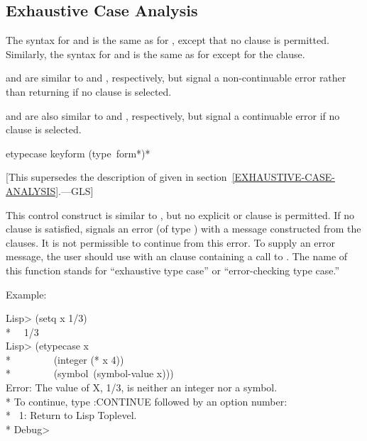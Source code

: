 \subsection{Exhaustive Case Analysis}
\label{EXHAUSTIVE-CASE-ANALYSIS-CONDITIONS}

The syntax for  and  is the same as for , except
that no  clause is permitted. Similarly, the syntax for  and
 is the same as for  except for the  clause.

 and  are similar to  and , respectively, but signal
a non-continuable error rather than returning  if no clause is selected.

 and  are also similar to  and , respectively,
but signal a
continuable error if no clause is selected.

\begin{defmac}
etypecase keyform {(type {\,form}*)}*

   [This supersedes the description of 
   given in section~\ref{EXHAUSTIVE-CASE-ANALYSIS}.---GLS]

  This control construct is similar to , but no explicit 
  or  clause is permitted. If no clause is satisfied,  signals 
  an error (of type ) with a message constructed from the clauses.
  It is not permissible to continue from this error. To supply an error
  message, the user should use  with an  clause containing 
  a call to . The name of this function stands for ``exhaustive type
  case'' or ``error-checking type case.''

  Example:
\begin{lisp}
Lisp> (setq x 1/3) \\*
~\EV\ 1/3 \\
Lisp> (etypecase x \\*
~~~~~~~~(integer (* x 4)) \\*
~~~~~~~~(symbol~(symbol-value x))) \\
Error: The value of X, 1/3, is neither an integer nor a symbol. \\*
To continue, type :CONTINUE followed by an option number: \\*
~1: Return to Lisp Toplevel. \\*
Debug>
\end{lisp}
\end{defmac}

